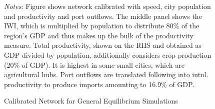 \documentclass[a4paper]{article}
\begin{document}
\begin{figure}[H] \vspace{-1mm}
\centering
\caption{\label{fig:Graph_Calib} Calibrated Network for General Equilibrium Simulations}
\vspace{2mm}
\raggedright
\scriptsize 
\emph{Notes:} Figure shows network calibrated with speed, city population and productivity and port outflows. The middle panel shows the IWI, which is multiplied by population to distribute 80\% of the region's GDP and thus makes up the bulk of the productivity measure. Total productivity, shown on the RHS and obtained as GDP divided by population, additionally considers crop production (20\% of GDP). It is highest in some small cities, which are agricultural hubs. Port outflows are translated following \citep{krantz2024optimal} into intnl. productivity to produce imports amounting to 16.9\% of GDP. 
\end{figure}
\end{document}
